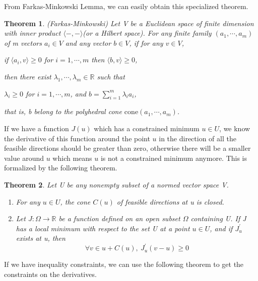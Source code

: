 \documentclass[a4paper]{report}
\newtheorem{theorem}{Theorem}[section]
\begin{document}
From Farkas-Minkowski Lemma, we can easily obtain this specialized theorem. 
\begin{theorem}
    (Farkas-Minkowski\cite{gallier2019algebra}) Let V be a Euclidean space of finite dimension with inner product $\langle -,-\rangle$(or a Hilbert space). For any finite family $(a_1,\cdots,a_m)$ of m vectors $a_i\in V$ and any vector $b\in V$, if for any $v\in V$,
    \begin{center}
        if $\langle a_i, v\rangle \geq 0$ for $i=1,\cdots,m$ then $\langle b,v\rangle\geq 0$,
    \end{center}
    then there exist $\lambda_1,\cdots,\lambda_m\in \mathbb R$ such that
    \begin{center}
        $\lambda_i\geq 0$ for $i=1,\cdots,m$, and $b=\sum\limits_{i=1}^m \lambda_ia_i$,
    \end{center}
    that is, b belong to the polyhedral cone $\mathrm{cone} (a_1,\cdots,a_m)$.
\end{theorem}

If we have a function $J(u)$ which has a constrained minimum $u\in U$, we know the derivative of this function around the point $u$ in the direction of all the feasible directions should be greater than zero, otherwise there will be a smaller value around $u$ which means $u$ is not a constrained minimum anymore. This is formalized by the following theorem.

\begin{theorem}
    Let U be any nonempty subset of a normed vector space V.
    \begin{enumerate}[label={(\arabic*)}]
        \item For any $u\in U$, the cone $C(u)$ of feasible directions at u is closed.
        \item Let $J:\Omega\to \mathbb R$ be a function defined on an open subset $\Omega$ containing U. If J has a local minimum with respect to the set U at a point $u\in U$, and if $J^\prime_u$ exists at u, then
            \[
                \forall v\in u+C(u),\ J^\prime_u(v-u)\geq 0
            \]
    \end{enumerate}
\end{theorem}

If we have inequality constraints, we can use the following theorem to get the constraints on the derivatives.
\end{document}
